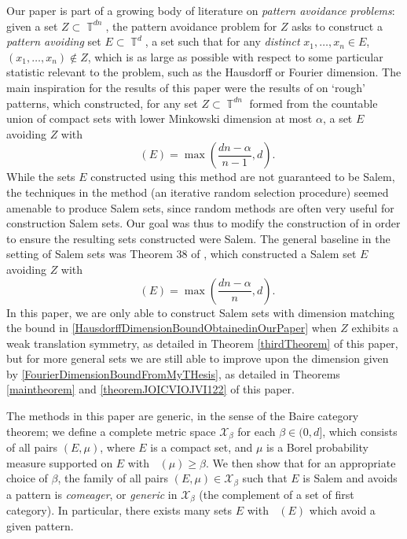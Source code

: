 \documentclass[dvipsnames,letterpaper,12pt]{article}
\numberwithin{equation}{section}
\DeclareMathOperator{\hausdim}{\dim_{\mathbb{H}}}
\DeclareMathOperator{\fordim}{\dim_{\mathbb{F}}}
\DeclareMathOperator{\TT}{\mathbb{T}}
\numberwithin{theorem}{section}
\begin{document}
Our paper is part of a growing body of literature on \emph{pattern avoidance problems}: given a set $Z \subset \TT^{dn}$, the pattern avoidance problem for $Z$ asks to construct a \emph{pattern avoiding} set $E \subset \TT^d$, a set such that for any \emph{distinct} $x_1,\dots,x_n \in E$, $(x_1,\dots,x_n) \not \in Z$, which is as large as possible with respect to some particular statistic relevant to the problem, such as the Hausdorff or Fourier dimension. The main inspiration for the results of this paper were the results of \cite{OurPaper} on `rough' patterns, which constructed, for any set $Z \subset \TT^{dn}$ formed from the countable union of compact sets with lower Minkowski dimension at most $\alpha$, a set $E$ avoiding $Z$ with
%
\begin{equation} \label{HausdorffDimensionBoundObtainedinOurPaper}
    \hausdim(E) = \max\left( \frac{dn - \alpha}{n - 1}, d \right).
\end{equation}
%
While the sets $E$ constructed using this method are not guaranteed to be Salem, the techniques in the method (an iterative random selection procedure) seemed amenable to produce Salem sets, since random methods are often very useful for construction Salem sets. Our goal was thus to modify the construction of \cite{OurPaper} in order to ensure the resulting sets constructed were Salem. The general baseline in the setting of Salem sets was Theorem 38 of \cite{MyThesis}, which constructed a Salem set $E$ avoiding $Z$ with
%
\begin{equation} \label{FourierDimensionBoundFromMyTHesis}
    \fordim(E) = \max \left( \frac{dn - \alpha}{n}, d \right).
\end{equation}
%
In this paper, we are only able to construct Salem sets with dimension matching the bound in \eqref{HausdorffDimensionBoundObtainedinOurPaper} when $Z$ exhibits a weak translation symmetry, as detailed in Theorem \ref{thirdTheorem} of this paper, but for more general sets we are still able to improve upon the dimension given by \eqref{FourierDimensionBoundFromMyTHesis}, as detailed in Theorems \ref{maintheorem} and \ref{theoremJOICVIOJVI122} of this paper.

The methods in this paper are generic, in the sense of the Baire category theorem; we define a complete metric space $\mathcal{X}_\beta$ for each $\beta \in (0,d]$, which consists of all pairs $(E,\mu)$, where $E$ is a compact set, and $\mu$ is a Borel probability measure supported on $E$ with $\fordim(\mu) \geq \beta$. We then show that for an appropriate choice of $\beta$, the family of all pairs $(E,\mu) \in \mathcal{X}_\beta$ such that $E$ is Salem and avoids a pattern is \emph{comeager}, or \emph{generic} in $\mathcal{X}_\beta$ (the complement of a set of first category). In particular, there exists many sets $E$ with $\fordim(E)$ which avoid a given pattern.
\end{document}
